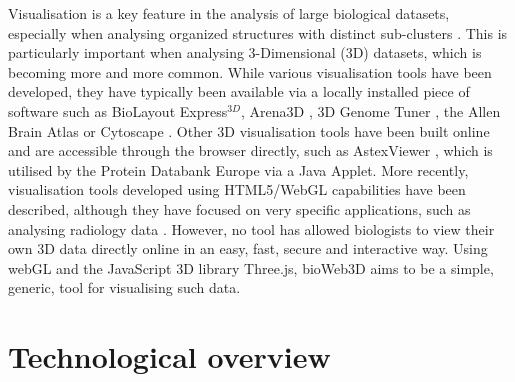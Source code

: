 \documentclass{bioinfo}
\begin{document}
Visualisation is a key feature in the analysis of large biological datasets, especially when analysing organized structures with distinct sub-clusters \citep{Rubel10}. This is particularly important when analysing 3-Dimensional (3D) datasets, which is becoming more and more common. While various visualisation tools have been developed, they have typically been available via a locally installed piece of software such as BioLayout Express$^{3D}$\citep{Freeman07}, Arena3D \citep{Pavlopoulos08},  3D Genome Tuner \citep{Wang09}, the Allen Brain Atlas \citep{Lein07} or Cytoscape \citep{Shannon03}. Other 3D visualisation tools have been built online and are accessible through the browser directly, such as AstexViewer \citep{Hartshorn02}, which is utilised by the Protein Databank Europe via a Java Applet. More recently, visualisation tools developed using HTML5/WebGL capabilities have been described, although they have focused on very specific applications, such as analysing radiology data  \citep{Dinesh12}. However, no tool has allowed biologists to view their own 3D data directly online in an easy, fast, secure and interactive way. Using webGL and the JavaScript 3D library Three.js, bioWeb3D aims to be a simple, generic, tool for visualising such data.



\section{Technological overview}
\end{document}
